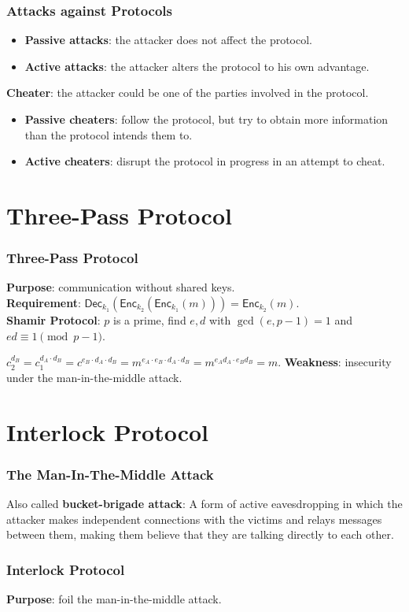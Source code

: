 \begin{frame}\frametitle{Attacks against Protocols}
\begin{itemize}
\item \textbf{Passive attacks}: the attacker does not affect the protocol.
\item \textbf{Active attacks}: the attacker alters the protocol to his own advantage.
\end{itemize}
\textbf{Cheater}: the attacker could be one of the parties involved in the protocol.
\begin{itemize}
\item \textbf{Passive cheaters}: follow the protocol, but try to obtain more information than the protocol intends them to.
\item \textbf{Active cheaters}: disrupt the protocol in progress in an attempt to cheat.
\end{itemize}
\end{frame}
\section{Three-Pass Protocol}
\begin{frame}\frametitle{Three-Pass Protocol}
\textbf{Purpose}: communication without shared keys.\\
\textbf{Requirement}: $\mathsf{Dec}_{k_1}(\mathsf{Enc}_{k_2}(\mathsf{Enc}_{k_1}(m))) = \mathsf{Enc}_{k_2}(m)$.\\
\textbf{Shamir Protocol}: $p$ is a prime, find $e,d$ with $\gcd(e,p-1)=1$ and $ed \equiv 1 \pmod{p-1}$.

\begin{figure}
\begin{center}

\end{center}
\end{figure}
$c_2^{d_B} = c_1^{d_A\cdot d_B} = c^{e_B\cdot d_A\cdot d_B} = m^{e_A\cdot e_B\cdot d_A\cdot d_B} = m^{e_Ad_A\cdot e_Bd_B} = m$.
\textbf{Weakness}: insecurity under the man-in-the-middle attack.
\end{frame}
\section{Interlock Protocol}
\begin{frame}\frametitle{The Man-In-The-Middle Attack}
Also called \textbf{bucket-brigade attack}: A form of active eavesdropping in which the attacker makes independent connections with the victims and relays messages between them, making them believe that they are talking directly to each other.
\begin{figure}
\begin{center}

\end{center}
\end{figure}
\end{frame}
\begin{frame}\frametitle{Interlock Protocol}
\textbf{Purpose}: foil the man-in-the-middle attack.
\begin{figure}
\begin{center}

\end{center}
\end{figure}
\end{frame}
